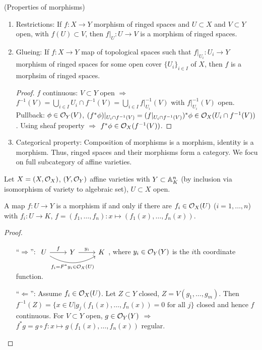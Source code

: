 \documentclass[a4paper,11pt]{article}
\begin{document}
			
			\begin{remark}\label{rem--morphism}
				(Properties of morphisms)
				\begin{enumerate}
					\item Restrictions: If $f:X\rightarrow Y$ morphism of ringed spaces and $U\subset X$ and $V\subset Y$ open, with $f(U)\subset V$, then $f|_U:U\rightarrow V$ is a morphism of ringed spaces.
					\item Glueing: If $f:X\rightarrow Y$ map of topological spaces such that $f|_{U_i}:U_i\rightarrow Y$ morphism of ringed spaces for some open cover $\{U_i\}_{i\in I}$ of $X$, then $f$ is a morphsim of ringed spaces.
					\begin{proof}
						$f$ continuous: $V\subset Y$ open $\Longrightarrow$ $f^{-1}(V)=\bigcup_{i\in I}U_i\cap f^{-1}(V)=\bigcup_{i\in I}f|_{U_i}^{-1}(V)$ with $f|_{U_i}^{-1}(V)$ open. Pullback: $\phi\in\O_Y(V)$, $(f^\ast\phi)|_{U_i\cap f^{-1}(V)}=(f|_{U_i\cap f^{-1}(V)})^\ast\phi\in\O_X(U_i\cap f^{-1}(V))$. Using sheaf property $\Longrightarrow$ $f^\ast\phi\in\O_X(f^{-1}(V))$.
					\end{proof}
					\item Categorical property: Composition of morphisms is a morphism, identity is a morphism. Thus, ringed spaces and their morphisms form a category. We focu on full subcategory of affine varieties.
				\end{enumerate}
			\end{remark}

			Let $X=(X,\O_X)$, $(Y,\O_Y)$ affine varieties with $Y\subset\AA^n_K$ (by inclusion via isomorphism of variety to algebraic set), $U\subset X$ open.

			\begin{prop}\label{prop--morphism}
				A map $f:U\rightarrow Y$ is a morphism if and only if there are $f_i\in\O_X(U)$ ($i=1,\dots,n$) with $f_i:U\rightarrow K$, $f=(f_1,\dots,f_n):x\mapsto(f_1(x),\dots,f_n(x))$.
			\end{prop}
			\begin{proof}
				\begin{enumerate}
					\item[``$\Rightarrow$'':] $\begin{tikzcd}
						U\ar[r,"f"]\ar[rr,"f_i=F^\ast y_i\in\O_X(U)"',bend right] & Y\ar[r,"y_i"] & K
					\end{tikzcd}$, where $y_i\in\O_Y(Y)$ is the $i$th coordinate function.
					\item[``$\Leftarrow$'':] Assume $f_i\in\O_X(U)$. Let $Z\subset Y$ closed, $Z=V(g_1,\dots,g_m)$. Then $f^{-1}(Z)=\{x\in U|g_j(f_1(x),\dots,f_n(x))=0\text{ for all }j\}$ closed and hence $f$ continuous. For $V\subset Y$ open, $g\in\O_Y(Y)$ $\Longrightarrow$ $f^\ast g=g\circ f:x\mapsto g(f_1(x),\dots,f_n(x))$ regular.
				\end{enumerate}
			\end{proof}
\end{document}
